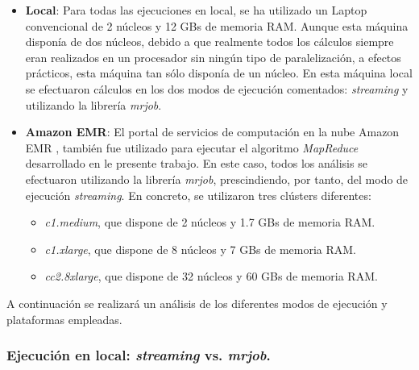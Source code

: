 \documentclass[10pt, spanish]{article}
\begin{document}
\begin{itemize}
\item \textbf{Local}: Para todas las ejecuciones en local, se ha utilizado un Laptop convencional de 2 núcleos y 12 GBs de memoria RAM. Aunque esta máquina disponía de dos núcleos, debido a que realmente todos los cálculos siempre eran realizados en un procesador sin ningún tipo de paralelización, a efectos prácticos, esta máquina tan sólo disponía de un núcleo. En esta máquina local se efectuaron cálculos en los dos modos de ejecución comentados: \textit{streaming} y utilizando la librería \textit{mrjob}.
\item \textbf{Amazon EMR}: El portal de servicios de computación en la nube Amazon EMR \cite{amazon_emr}, también fue utilizado para ejecutar el algoritmo \textit{MapReduce} desarrollado en le presente trabajo. En este caso, todos los análisis se efectuaron utilizando la librería \textit{mrjob}, prescindiendo, por tanto, del modo de ejecución \textit{streaming}. En concreto, se utilizaron tres clústers diferentes:
\begin{itemize}
\item \textit{c1.medium}, que dispone de 2 núcleos y 1.7 GBs de memoria RAM.
\item \textit{c1.xlarge}, que dispone de 8 núcleos y 7 GBs de memoria RAM.
\item \textit{cc2.8xlarge}, que dispone de 32 núcleos y 60 GBs de memoria RAM.
\end{itemize}
\end{itemize}

A continuación se realizará un análisis de los diferentes modos de ejecución y plataformas empleadas.

\subsubsection{Ejecución en local: \textit{streaming} vs. \textit{mrjob}.}
\end{document}

